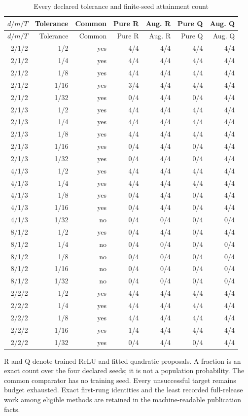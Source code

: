 {\small\setlength{\tabcolsep}{3pt}
\begin{longtable}{rrrrrrr}
\caption{Every declared tolerance and finite-seed attainment count}\label{tab:targets62} \\
\hline
$d/m/T$ & Tolerance & Common & Pure R & Aug. R & Pure Q & Aug. Q \\
\hline\endfirsthead
\hline
$d/m/T$ & Tolerance & Common & Pure R & Aug. R & Pure Q & Aug. Q \\
\hline\endhead
2/1/2 & 1/2 & yes & 4/4 & 4/4 & 4/4 & 4/4 \\
2/1/2 & 1/4 & yes & 4/4 & 4/4 & 4/4 & 4/4 \\
2/1/2 & 1/8 & yes & 4/4 & 4/4 & 4/4 & 4/4 \\
2/1/2 & 1/16 & yes & 3/4 & 4/4 & 4/4 & 4/4 \\
2/1/2 & 1/32 & yes & 0/4 & 4/4 & 0/4 & 4/4 \\
2/1/3 & 1/2 & yes & 4/4 & 4/4 & 4/4 & 4/4 \\
2/1/3 & 1/4 & yes & 4/4 & 4/4 & 4/4 & 4/4 \\
2/1/3 & 1/8 & yes & 4/4 & 4/4 & 4/4 & 4/4 \\
2/1/3 & 1/16 & yes & 0/4 & 4/4 & 0/4 & 4/4 \\
2/1/3 & 1/32 & yes & 0/4 & 4/4 & 0/4 & 4/4 \\
4/1/3 & 1/2 & yes & 4/4 & 4/4 & 4/4 & 4/4 \\
4/1/3 & 1/4 & yes & 4/4 & 4/4 & 4/4 & 4/4 \\
4/1/3 & 1/8 & yes & 0/4 & 4/4 & 0/4 & 4/4 \\
4/1/3 & 1/16 & yes & 0/4 & 4/4 & 0/4 & 4/4 \\
4/1/3 & 1/32 & no & 0/4 & 0/4 & 0/4 & 0/4 \\
8/1/2 & 1/2 & yes & 0/4 & 4/4 & 0/4 & 4/4 \\
8/1/2 & 1/4 & no & 0/4 & 0/4 & 0/4 & 0/4 \\
8/1/2 & 1/8 & no & 0/4 & 0/4 & 0/4 & 0/4 \\
8/1/2 & 1/16 & no & 0/4 & 0/4 & 0/4 & 0/4 \\
8/1/2 & 1/32 & no & 0/4 & 0/4 & 0/4 & 0/4 \\
2/2/2 & 1/2 & yes & 4/4 & 4/4 & 4/4 & 4/4 \\
2/2/2 & 1/4 & yes & 4/4 & 4/4 & 4/4 & 4/4 \\
2/2/2 & 1/8 & yes & 4/4 & 4/4 & 4/4 & 4/4 \\
2/2/2 & 1/16 & yes & 1/4 & 4/4 & 4/4 & 4/4 \\
2/2/2 & 1/32 & yes & 0/4 & 4/4 & 0/4 & 4/4 \\
\hline
\end{longtable}}
{\footnotesize R and Q denote trained ReLU and fitted quadratic proposals. A fraction is an exact count over the four declared seeds; it is not a population probability. The common comparator has no training seed. Every unsuccessful target remains budget exhausted. Exact first-rung identities and the least recorded full-release work among eligible methods are retained in the machine-readable publication facts.}
